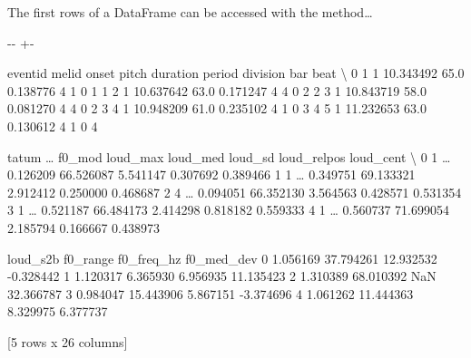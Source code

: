 \documentclass[letterpaper,10pt,english]{sphinxmanual}
\newlength\nbsphinxcodecellspacing
\begin{document}
The first rows of a DataFrame can be accessed with the  method…

{
\begin{sphinxVerbatim}[commandchars=\\\{\}]
\llap{\color{nbsphinxin}[19]:\,\hspace{\fboxrule}\hspace{\fboxsep}}
\end{sphinxVerbatim}
}

{

\kern-\sphinxverbatimsmallskipamount\kern-\baselineskip
\kern+\FrameHeightAdjust\kern-\fboxrule
\vspace{\nbsphinxcodecellspacing}

\begin{sphinxVerbatim}[commandchars=\\\{\}]
\llap{\color{nbsphinxout}[19]:\,\hspace{\fboxrule}\hspace{\fboxsep}}   eventid  melid      onset  pitch  duration  period  division  bar  beat  \textbackslash{}
0        1      1  10.343492   65.0  0.138776       4         1    0     1
1        2      1  10.637642   63.0  0.171247       4         4    0     2
2        3      1  10.843719   58.0  0.081270       4         4    0     2
3        4      1  10.948209   61.0  0.235102       4         1    0     3
4        5      1  11.232653   63.0  0.130612       4         1    0     4

   tatum  {\ldots}  f0\_mod  loud\_max   loud\_med   loud\_sd  loud\_relpos loud\_cent  \textbackslash{}
0      1  {\ldots}          0.126209  66.526087  5.541147     0.307692  0.389466
1      1  {\ldots}          0.349751  69.133321  2.912412     0.250000  0.468687
2      4  {\ldots}          0.094051  66.352130  3.564563     0.428571  0.531354
3      1  {\ldots}          0.521187  66.484173  2.414298     0.818182  0.559333
4      1  {\ldots}          0.560737  71.699054  2.185794     0.166667  0.438973

   loud\_s2b   f0\_range  f0\_freq\_hz  f0\_med\_dev
0  1.056169  37.794261   12.932532   -0.328442
1  1.120317   6.365930    6.956935   11.135423
2  1.310389  68.010392         NaN   32.366787
3  0.984047  15.443906    5.867151   -3.374696
4  1.061262  11.444363    8.329975    6.377737

[5 rows x 26 columns]
\end{sphinxVerbatim}
}
\end{document}
